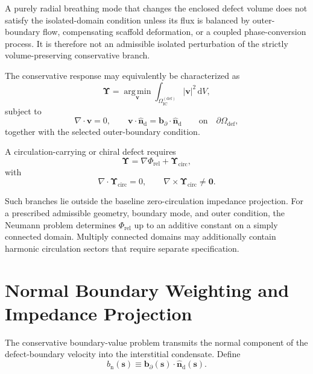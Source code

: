 A purely radial breathing mode that changes the enclosed defect volume does not satisfy the isolated-domain condition unless its flux is balanced by outer-boundary flow, compensating scaffold deformation, or a coupled phase-conversion process. It is therefore not an admissible isolated perturbation of the strictly volume-preserving conservative branch.

The conservative response may equivalently be characterized as
\begin{equation}
    \boldsymbol{\Upsilon}
    =
    \operatorname*{arg\,min}_{\mathbf{v}}
    \int_{\Omega_{\mathrm{IC}}^{(\mathrm{def})}}
    |\mathbf{v}|^2
    \,
    \mathrm{d}V,
\end{equation}
subject to
\begin{equation}
    \nabla\cdot\mathbf{v}
    =
    0,
    \qquad
    \mathbf{v}\cdot\hat{\mathbf{n}}_{\mathrm{d}}
    =
    \mathbf{b}_{\partial}
    \cdot
    \hat{\mathbf{n}}_{\mathrm{d}}
    \qquad
    \mathrm{on}
    \quad
    \partial\Omega_{\mathrm{def}},
\end{equation}
together with the selected outer-boundary condition.

A circulation-carrying or chiral defect requires
\begin{equation}
    \boldsymbol{\Upsilon}
    =
    \nabla\Phi_{\mathrm{rel}}
    +
    \boldsymbol{\Upsilon}_{\mathrm{circ}},
\end{equation}
with
\begin{equation}
    \nabla\cdot\boldsymbol{\Upsilon}_{\mathrm{circ}}
    =
    0,
    \qquad
    \nabla\times\boldsymbol{\Upsilon}_{\mathrm{circ}}
    \neq
    \mathbf{0}.
\end{equation}

Such branches lie outside the baseline zero-circulation impedance projection. For a prescribed admissible geometry, boundary mode, and outer condition, the Neumann problem determines $\Phi_{\mathrm{rel}}$ up to an additive constant on a simply connected domain. Multiply connected domains may additionally contain harmonic circulation sectors that require separate specification.


\section[Normal Boundary Impedance Projection]{Normal Boundary Weighting and Impedance Projection}
\label{sec:AP_normal_boundary_impedance}

The conservative boundary-value problem transmits the normal component of the defect-boundary velocity into the interstitial condensate. Define
\begin{equation}
    b_{\mathrm{n}}(\boldsymbol{s})
    \equiv
    \mathbf{b}_{\partial}(\boldsymbol{s})
    \cdot
    \hat{\mathbf{n}}_{\mathrm{d}}(\boldsymbol{s}).
\end{equation}

